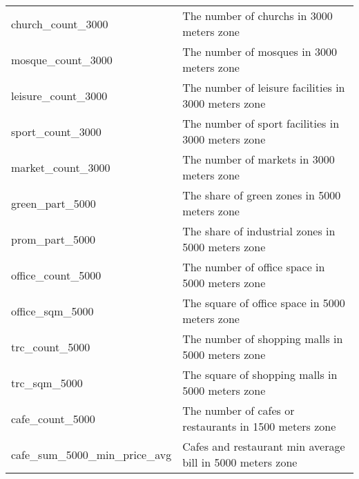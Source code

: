 \begin{longtable}[c]{ll}
    church\_count\_3000                        & The number of churchs in 3000 meters zone                                                                                 \\
    mosque\_count\_3000                        & The number of mosques in 3000 meters zone                                                                                 \\
    leisure\_count\_3000                       & The number of leisure facilities in 3000 meters zone                                                                      \\
    sport\_count\_3000                         & The number of sport facilities in 3000 meters zone                                                                        \\
    market\_count\_3000                        & The number of markets in 3000 meters zone                                                                                 \\
    green\_part\_5000                          & The share of green zones in 5000 meters zone                                                                              \\
    prom\_part\_5000                           & The share of industrial zones in 5000 meters zone                                                                         \\
    office\_count\_5000                        & The number of office space in 5000 meters zone                                                                            \\
    office\_sqm\_5000                          & The square of office space in 5000 meters zone                                                                            \\
    trc\_count\_5000                           & The number of shopping malls in 5000 meters zone                                                                          \\
    trc\_sqm\_5000                             & The square of shopping malls in 5000 meters zone                                                                          \\
    cafe\_count\_5000                          & The number of cafes or restaurants in 1500 meters zone                                                                    \\
    cafe\_sum\_5000\_min\_price\_avg           & Cafes and restaurant min average bill in 5000 meters zone                                                                 \\

\end{longtable}
